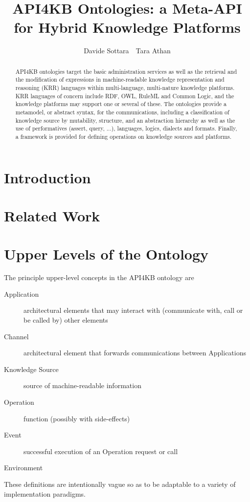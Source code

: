 \documentclass[runningheads]{llncs}
\title{API4KB Ontologies: a Meta-API for Hybrid Knowledge Platforms}
\date{}
\begin{document}
%
\author{Davide Sottara\ \ Tara Athan}

%
\maketitle

\begin{abstract}
API4KB ontologies target the basic administration
services as well as the retrieval and the modification of expressions in machine-readable knowledge representation and reasoning (KRR) languages within multi-language, multi-nature knowledge platforms.
KRR languages of concern include RDF, OWL, RuleML and Common Logic, and the knowledge platforms may support one or several of these.
The ontologies provide a metamodel, or abstract syntax, for the communications, including a classification of knowledge source by mutability, structure, and an abstraction hierarchy as well as the use of performatives (assert, query, ...), languages, logics, dialects and formats. Finally, a framework is provided for defining operations on knowledge sources and platforms.
\end{abstract}

%
\section{Introduction}
\label{intro}

\section{Related Work}

\section{Upper Levels of the Ontology}
\label{upper}
The principle upper-level concepts in the API4KB ontology are
\begin{description}
\item[Application] architectural elements that may interact with (communicate with, call or be called by) other elements
\item[Channel] architectural element that forwards communications between Applications 
\item[Knowledge Source] source of machine-readable information
\item[Operation] function (possibly with side-effects)
\item[Event] successful execution of an Operation request or call
\item[Environment]
\end{description}
These definitions are intentionally vague so as to be adaptable to a variety of implementation paradigms. 
\end{document}
